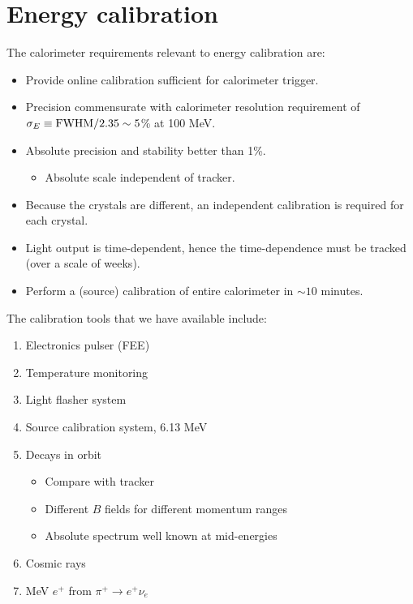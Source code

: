 \section{Energy calibration}
\def\color#1{\relax}

The calorimeter requirements relevant to energy calibration are:

\begin{itemize}
\item Provide online calibration sufficient for calorimeter trigger.
\item Precision commensurate with calorimeter resolution requirement of $\sigma_E\equiv \hbox{FWHM}/2.35 \sim 5$\% at 100 MeV. %
\item Absolute precision and stability better than 1\%.
\begin{itemize}
\item Absolute scale independent of tracker.
\end{itemize}
\item Because the crystals are different, an independent calibration is required for each crystal. 
\item Light output is time-dependent, hence the time-dependence must be tracked (over a scale of weeks).
\item Perform a (source) calibration of entire calorimeter in $\sim10$ minutes.
\end{itemize}

The calibration tools that we have available include:

\begin{enumerate}
\item Electronics pulser (FEE)
\item Temperature monitoring
 \item Light flasher system %
 \item  {\color{red} Source calibration system, 6.13 MeV} %
 \item {\color{magenta} Decays in orbit} %
\begin{itemize}
\item Compare with tracker 
\item Different $B$ fields for different momentum ranges 
\item Absolute spectrum well known at mid-energies 
\end{itemize}
 \item {\color{blue} Cosmic rays} %
 \item {\color{brown} 70 MeV $e^+$ from $\pi^+\to e^+\nu_e$} 
\end{enumerate}


